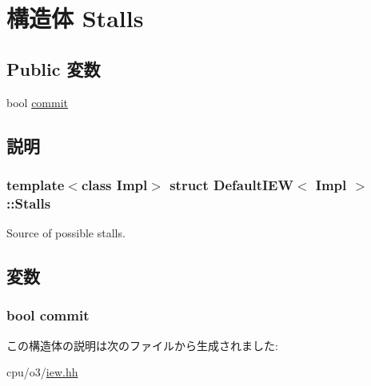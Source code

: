 \hypertarget{structDefaultIEW_1_1Stalls}{
\section{構造体 Stalls}
\label{structDefaultIEW_1_1Stalls}
}
\subsection*{Public 変数}
\begin{DoxyCompactItemize}
\item 
bool \hyperlink{structDefaultIEW_1_1Stalls_ad7d6b839c43385b5fffdf2beaff214ec}{commit}
\end{DoxyCompactItemize}


\subsection{説明}
\subsubsection*{template$<$class Impl$>$ struct DefaultIEW$<$ Impl $>$::Stalls}

Source of possible stalls. 

\subsection{変数}
\hypertarget{structDefaultIEW_1_1Stalls_ad7d6b839c43385b5fffdf2beaff214ec}{
\subsubsection[{commit}]{\setlength{\rightskip}{0pt plus 5cm}bool {\bf commit}}}
\label{structDefaultIEW_1_1Stalls_ad7d6b839c43385b5fffdf2beaff214ec}


この構造体の説明は次のファイルから生成されました:\begin{DoxyCompactItemize}
\item 
cpu/o3/\hyperlink{iew_8hh}{iew.hh}\end{DoxyCompactItemize}
